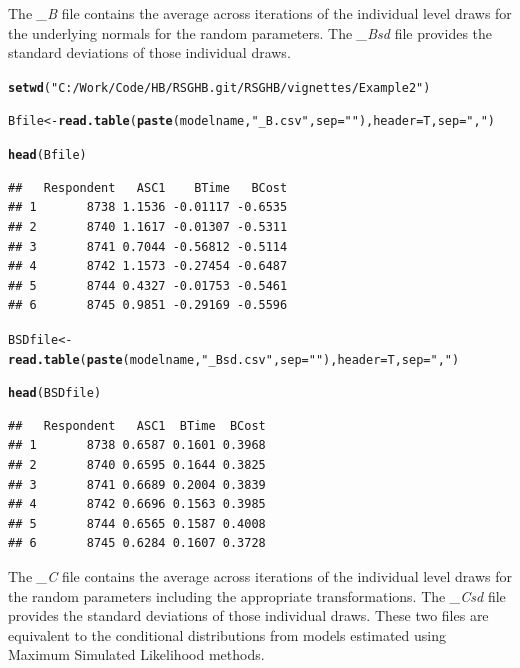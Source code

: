 \documentclass{article}\usepackage{graphicx, color}
\makeatletter
\newcommand{\hlfunctioncall}[1]{\textcolor[rgb]{0.501960784313725,0,0.329411764705882}{\textbf{#1}}}%
\newcommand{\hlstring}[1]{\textcolor[rgb]{0.6,0.6,1}{#1}}%
\newenvironment{kframe}{%
 \def\at@end@of@kframe{}%
 \ifinner\ifhmode%
  \def\at@end@of@kframe{\end{minipage}}%
  \begin{minipage}{\columnwidth}%
 \fi\fi%
 \def\FrameCommand##1{\hskip\@totalleftmargin \hskip-\fboxsep
 \colorbox{shadecolor}{##1}\hskip-\fboxsep
     \hskip-\linewidth \hskip-\@totalleftmargin \hskip\columnwidth}%
 \MakeFramed {\advance\hsize-\width
   \@totalleftmargin\z@ \linewidth\hsize
   \@setminipage}}%
 {\par\unskip\endMakeFramed%
 \at@end@of@kframe}
\newenvironment{knitrout}{}{} %
\makeatother
\begin{document}
The \emph{\_B} file contains the average across iterations of the individual level draws for the underlying normals for the random parameters. The \emph{\_Bsd} file provides the standard deviations of those individual draws.

\begin{knitrout}
\color{fgcolor}\begin{kframe}
\begin{alltt}

\hlfunctioncall{setwd}(\hlstring{"C:/Work/Code/HB/RSGHB.git/RSGHB/vignettes/Example2"})

Bfile <- \hlfunctioncall{read.table}(\hlfunctioncall{paste}(modelname, \hlstring{"_B.csv"}, sep = \hlstring{""}), header = T, sep = \hlstring{","})

\hlfunctioncall{head}(Bfile)
\end{alltt}
\begin{verbatim}
##   Respondent   ASC1    BTime   BCost
## 1       8738 1.1536 -0.01117 -0.6535
## 2       8740 1.1617 -0.01307 -0.5311
## 3       8741 0.7044 -0.56812 -0.5114
## 4       8742 1.1573 -0.27454 -0.6487
## 5       8744 0.4327 -0.01753 -0.5461
## 6       8745 0.9851 -0.29169 -0.5596
\end{verbatim}
\begin{alltt}

BSDfile <- \hlfunctioncall{read.table}(\hlfunctioncall{paste}(modelname, \hlstring{"_Bsd.csv"}, sep = \hlstring{""}), header = T, sep = \hlstring{","})

\hlfunctioncall{head}(BSDfile)
\end{alltt}
\begin{verbatim}
##   Respondent   ASC1  BTime  BCost
## 1       8738 0.6587 0.1601 0.3968
## 2       8740 0.6595 0.1644 0.3825
## 3       8741 0.6689 0.2004 0.3839
## 4       8742 0.6696 0.1563 0.3985
## 5       8744 0.6565 0.1587 0.4008
## 6       8745 0.6284 0.1607 0.3728
\end{verbatim}
\end{kframe}
\end{knitrout}


The \emph{\_C} file contains the average across iterations of the individual level draws for the random parameters including the appropriate transformations. The \emph{\_Csd} file provides the standard deviations of those individual draws. These two files are equivalent to the conditional distributions from models estimated using Maximum Simulated Likelihood methods.
\end{document}
